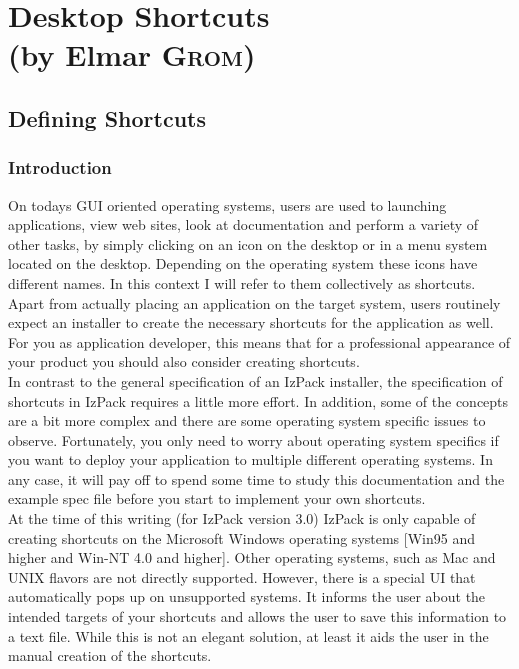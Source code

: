 

\chapter{Desktop Shortcuts \\
         (by Elmar \textsc{Grom})}

\section{Defining Shortcuts}

\subsection{Introduction}

On todays GUI oriented operating systems, users are used to launching
applications, view web sites, look at documentation and perform a
variety of other tasks, by simply clicking on an icon on the desktop or
in a menu system located on the desktop. Depending on the operating
system these icons have different names. In this context I will refer to
them collectively as shortcuts.\\

Apart from actually placing an application on the target system, users
routinely expect an installer to create the necessary shortcuts for the
application as well. For you as application developer, this means that
for a professional appearance of your product you should also
consider creating shortcuts.\\

In contrast to the general specification of an IzPack installer, the
specification of shortcuts in IzPack requires a little more effort. In
addition, some of the concepts are a bit more complex and there are some
operating system specific issues to observe. Fortunately, you only need
to worry about operating system specifics if you want to deploy your
application to multiple different operating systems. In any case, it
will pay off to spend some time to study this documentation and the
example spec file before you start to implement your own shortcuts.\\

At the time of this writing (for IzPack version 3.0) IzPack is only
capable of creating shortcuts on the Microsoft Windows operating systems
[Win95 and higher and Win-NT 4.0 and higher]. Other operating systems,
such as Mac and UNIX flavors are not directly supported. However, there
is a special UI that automatically pops up on unsupported systems. It
informs the user about the intended targets of your shortcuts and allows
the user to save this information to a text file. While this is not an
elegant solution, at least it aids the user in the manual creation of
the shortcuts.\\

